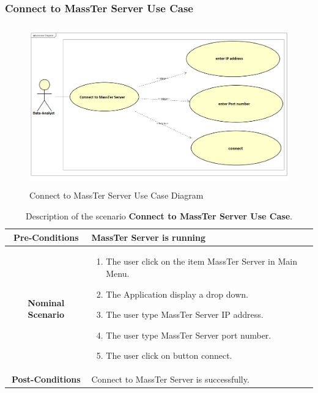 	 \subsubsection{Connect to MassTer Server Use Case}
	 \begin{figure}[h]
	 	\centering
	 	\includegraphics[width=14cm,height=7cm]{connectToMassTerServer.png}
	 	\caption{Connect to MassTer Server Use Case Diagram}
	 	
	 \end{figure}
 
 \begin{table}[!h]
 	\caption{Description of the scenario \textbf{Connect to MassTer Server Use Case}.}
 	\label{DSTabCTMS}
 	\centering
 	
 	\begin{tabular}{|c|p{10cm}|}
 		\hline 	
 		\textbf{Pre-Conditions } & MassTer Server is running  \\ 
 		\hline                     
 		\textbf{Nominal Scenario } & \begin{enumerate}
 			\item The user click on the item MassTer Server in Main Menu.
 			\item The Application display a drop down. 
 			\item The user type MassTer Server IP address.
 			\item The user type MassTer Server port number.
 			\item The  user click on button connect. 
 		\end{enumerate} \\ 
 		\hline 
 		\textbf{Post-Conditions} & Connect to MassTer Server is successfully. \\
 		\hline 
 	\end{tabular}
 \end{table}
 \clearpage
 \newpage
